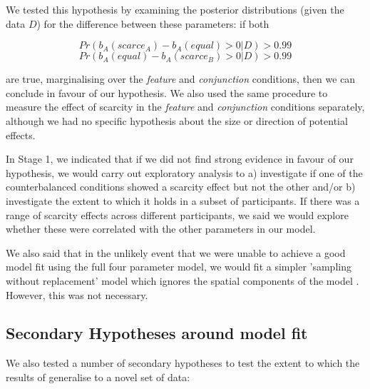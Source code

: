 \documentclass[12pt]{article}
\begin{document}
We tested this hypothesis by examining the posterior distributions (given the data $D$) for the difference between these parameters: if both

\begin{equation}
     Pr(b_A(\textit{scarce}_A) - b_A(\textit{equal}) > 0|D) > 0.99
\end{equation}
\begin{equation}
     Pr(b_A(\textit{equal}) - b_A(\textit{scarce}_B) > 0|D) > 0.99
\end{equation}

are true, marginalising over the \textit{feature} and \textit{conjunction} conditions, then we can conclude in favour of our hypothesis. We also used the same procedure to measure the effect of scarcity in the \textit{feature} and \textit{conjunction} conditions separately, although we had no specific hypothesis about the size or direction of potential effects. 

In Stage 1, we indicated that if we did not find strong evidence in favour of our hypothesis, we would carry out exploratory analysis to a) investigate if one of the counterbalanced conditions showed a scarcity effect but not the other and/or b) investigate the extent to which it holds in a subset of participants. If there was a range of scarcity effects across different participants, we said we would explore whether these were correlated with the other parameters in our model. 

We also said that in the unlikely event that we were unable to achieve a good model fit using the full four parameter model, we would fit a simpler 'sampling without replacement' model which ignores the spatial components of the model \citep{clarke2022foraging}. However, this was not necessary.

\subsection{Secondary Hypotheses around model fit}

We also tested a number of secondary hypotheses to test the extent to which the results of \citep{clarke2022foraging} generalise to a novel set of data:
\end{document}
